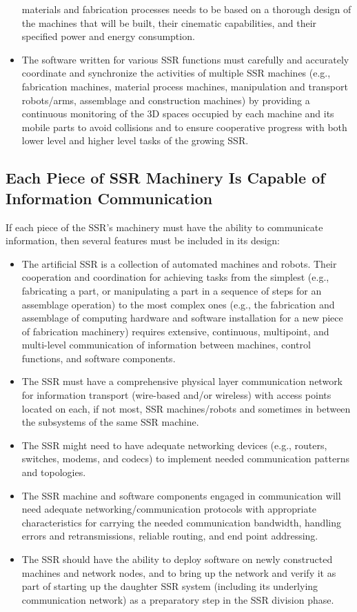 \begin{itemize}
materials and fabrication processes needs to be based on a thorough
design of the machines that will be built, their cinematic capabilities, and
their specified power and energy consumption.
\item The software written for various SSR functions must carefully and
accurately coordinate and synchronize the activities of
multiple SSR machines (e.g., fabrication machines, material process machines,
manipulation and transport robots/arms, assemblage and construction
machines) by providing a continuous monitoring of the 3D spaces occupied
by each machine and its mobile parts to avoid collisions and to ensure
cooperative progress with both lower level and higher level tasks of
the growing SSR.
\end{itemize}

\subsection[Each Piece of SSR Machinery Is Capable of Information Communication]{Each Piece of SSR Machinery Is Capable of Information Communication}

If each piece of the SSR's machinery must have the ability to communicate information, then several features must be included in its design:

\begin{itemize}
\item The artificial SSR is a collection of automated machines and
robots. Their cooperation and coordination for achieving tasks from the
simplest (e.g., fabricating a part, or manipulating a part in a sequence of
steps for an assemblage operation) to the most complex ones (e.g., the
fabrication and assemblage of computing hardware and software
installation for a new piece of fabrication machinery) requires extensive,
continuous, multipoint, and multi-level communication of
information between machines, control functions, and software
components.
\item The SSR must have a comprehensive physical layer communication
network for information transport (wire-based and/or wireless)
with access points located on each, if not most, SSR machines/robots and
sometimes in between the subsystems of the same SSR machine.
\item The SSR might need to have adequate networking devices (e.g.,
routers, switches, modems, and codecs) to implement needed communication
patterns and topologies.
\item The SSR machine and software components engaged in communication
will need adequate networking/communication protocols with appropriate
characteristics for carrying the needed communication bandwidth, handling 
errors and retransmissions, reliable routing, and end point addressing.
\item The SSR should have the ability to deploy software on newly
constructed machines and network nodes, and to bring up the
network and verify it as part of starting up the daughter SSR system
(including its underlying communication network) as a preparatory step
in the SSR division phase.
\end{itemize}

